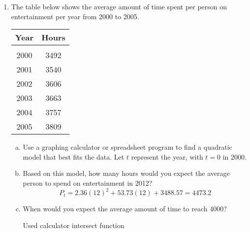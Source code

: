 \begin{enumerate}
\item The table below shows the average amount of time spent per person on entertainment per year from 2000 to 2005.
\begin{center}
\begin{tabular}{c c}
\textbf{Year} & \textbf{Hours}\\
\hline
 & \\
2000 & 3492\\
2001 & 3540\\
2002 & 3606\\
2003 & 3663\\
2004 & 3757\\
2005 & 3809
\end{tabular}
\end{center}
\begin{enumerate}[(a)]
\item Use a graphing calculator or spreadsheet program to find a quadratic model that best fits the data.  Let $t$ represent the year, with $t=0$ in 2000. 
\item Based on this model, how many hours would you expect the average person to spend on entertainment in 2012? 
\[P_t = 2.36(12)^2 + 53.73(12) + 3488.57 = 4473.2\]
\item When would you expect the average amount of time to reach 4000? 
\begin{center}
Used calculator intersect function
\end{center}
\end{enumerate}
\end{enumerate}